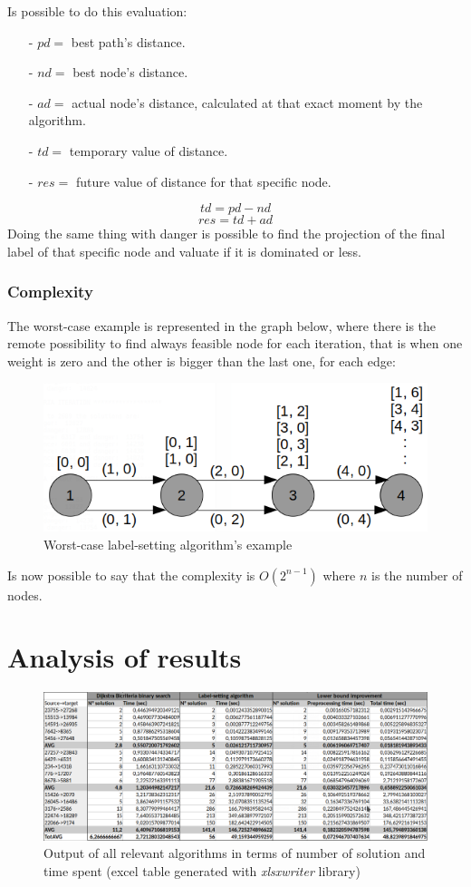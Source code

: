 \documentclass[a4paper,11pt]{report}
\begin{document}
Is possible to do this evaluation:
\begin{itemize}
	\item[-] $pd =$ best path's distance.
	\item[-] $nd =$ best node's distance.
	\item[-] $ad =$ actual node's distance, calculated at that exact moment by the algorithm.
	\item[-] $td =$ temporary value of distance.
	\item[-] $res =$ future value of distance for that specific node.
\end{itemize}
$$ td = pd - nd$$
$$res = td + ad$$
Doing the same thing with danger is possible to find the projection of the final label of that specific node and valuate if it is dominated or less.
\subsection{Complexity}
The worst-case example is represented in the graph below, where there is the remote possibility to find always feasible node for each iteration, that is when one weight is zero and the other is bigger than the last one, for each edge:

\begin{figure}[h]
	\centering
	\includegraphics[width=\linewidth]{img/labelSettingComplexity.png}
	\caption{Worst-case label-setting algorithm's example}
	\label{fig:worstCaseLabelSettin}
\end{figure}
Is now possible to say that the complexity is $O(2^{n-1})$ where $n$ is the number of nodes. 


\chapter{Analysis of results}
\begin{figure}[H]
	\centering
	\includegraphics[scale=0.4, angle=0, origin=c, trim=0.5mm 0 0 0, clip]{img/biCriteriaExcelOutput.png}
	\caption{Output of all relevant algorithms in terms of number of solution and time spent (excel table generated with \textit{xlsxwriter} library)}
	\label{fig:worstCaseLabelSetting}
\end{figure}
\end{document}
